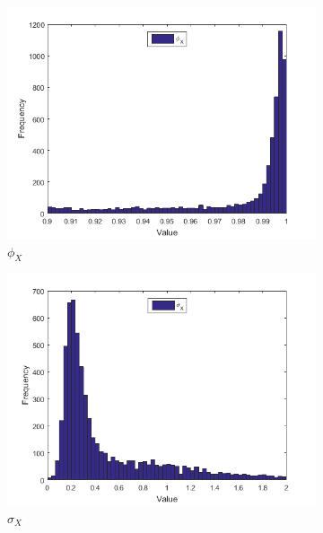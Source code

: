 \documentclass[11pt,a4,twosided,singlespacing,titlepagenumber=on]{scrreprt}
\numberwithin{equation}{chapter} %
\theoremstyle{remark}
\begin{document}
\begin{figure}[H]
    \centering
    \begin{subfigure}[t]{0.32\textwidth}
        \centering
        \includegraphics[width=1\textwidth]{res/params/6575_7306/1}
        \caption{$\phi_X$}
    \end{subfigure}
    \begin{subfigure}[t]{0.32\textwidth}
        \centering
        \includegraphics[width=1\textwidth]{res/params/6575_7306/2}
        \caption{$\sigma_X$}
    \end{subfigure}
    \begin{subfigure}[t]{0.32\textwidth}
        \centering

\end{subfigure}
\end{figure}
\end{document}
